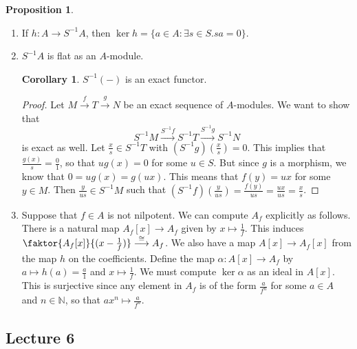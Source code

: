\documentclass[10pt,letterpaper,cm]{nupset}
\theoremstyle{definition}
\theoremstyle{theorem}
\newtheorem{prop}[definition]{Proposition}
\newtheorem{corollary}[definition]{Corollary}
\theoremstyle{remark}
\newcommand{\N}{\mathbb N}
\newcommand{\1}{\mathbf{1}}
\newcommand{\0}{\vec 0}
\begin{document}
\begin{prop} $ $
\begin{enumerate}
\item If $h: A \to S^{-1}A$, then $\ker{h} = \{a\in A : \exists s\in S. sa = 0\}$.
\item $S^{-1}A$ is flat as an $A$-module.
\begin{corollary}
$S^{-1}(-)$ is an exact functor.
\end{corollary}
\begin{proof}
Let $M \overset{f}{\longrightarrow} T \overset{g}{\longrightarrow} N$ be an exact sequence of $A$-modules. We want to show that $$S^{-1}M \overset{S^{-1}f}{\longrightarrow} S^{-1}T \overset{S^{-1}g}{\longrightarrow} S^{-1}N$$ is exact as well. Let $\frac{x}{s} \in S^{-1}T$ with $(S^{-1}g)\left(\frac{x}{s}\right) = 0$. This implies that $\frac{g(x)}{s} = \frac{0}{1}$, so that $ug(x) = 0$ for some $u\in S$. But since $g$ is a morphism, we know that $0 = ug(x) = g(ux)$. This means that $f(y) = ux$ for some $y\in M$. Then $\frac{y}{us}\in S^{-1}M$ such that $(S^{-1}f)\left(\frac{y}{us}\right) = \frac{f(y)}{us} = \frac{ux}{us} = \frac{x}{s}$.
\end{proof}
\item Suppose that $f\in A$ is not nilpotent. We can compute $A_f$ explicitly as follows. There is a natural map $A_f[x] \to A_f$ given by $x \mapsto \frac{1}{f}$. This induces $\faktor{A_f[x]}{(x-\frac{1}{f})} \overset{\cong}{\longrightarrow} A_f$. We also have a map $A[x] \to A_f[x]$ from the  map $h$ on the coefficients. Define the map $\alpha: A[x] \to A_f$ by $a \mapsto h(a) = \frac{a}{1}$ and $x\mapsto \frac{1}{f}$. We must compute $\ker{\alpha}$ as an ideal in $A[x]$. This is surjective since any element in $A_f$ is of the form $\frac{a}{f^n}$ for some $a\in A $ and $n\in \N$, so that $ax^n \mapsto \frac{a}{f^n}$.
\end{enumerate}
\end{prop}

\subsection{Lecture 6}
\end{document}
